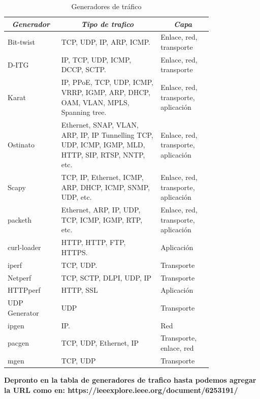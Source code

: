 \documentclass[12pt]{article}
\begin{document}
\begin{table}[htbp]
\footnotesize
\centering
\begin{tabular}{|p{0.2\linewidth}|p{0.4\linewidth}|p{0.2\linewidth}|}\hline
\multicolumn{1}{|c|}{\textit{\textbf{Generador}}} & 
\multicolumn{1}{|c|}{\textit{\textbf{Tipo de trafico}}} &
\multicolumn{1}{|c|}{\textit{\textbf{Capa}}}  \tabularnewline \hline

Bit-twist &
TCP, UDP, IP, ARP, ICMP. & 
Enlace, red, transporte  
\tabularnewline \hline

D-ITG &
IP, TCP, UDP, ICMP, DCCP, SCTP. & 
Enlace, red, transporte  
\tabularnewline \hline

Karat &
IP, PPoE, TCP, UDP, ICMP, VRRP, IGMP, ARP, DHCP, OAM, VLAN, MPLS, Spanning tree.
 & 
Enlace, red, transporte, aplicación  
\tabularnewline \hline

Ostinato &
Ethernet, SNAP, VLAN, ARP, IP, IP Tunnelling TCP, UDP, ICMP, IGMP, MLD, HTTP, SIP, RTSP, NNTP, etc. & 
Enlace, red, transporte, aplicación  
\tabularnewline \hline

Scapy &
TCP, IP, Ethernet, ICMP, ARP, DHCP, ICMP, SNMP, UDP, etc. & 
Enlace, red, transporte, aplicación  
\tabularnewline \hline

packeth &
Ethernet, ARP, IP, UDP, TCP, ICMP, IGMP, RTP, etc. & 
Enlace, red, transporte, aplicación  
\tabularnewline \hline

curl-loader &
HTTP, HTTP, FTP, HTTPS. & 
Aplicación  
\tabularnewline \hline

iperf &
TCP, UDP. & 
Transporte  
\tabularnewline \hline

Netperf &
TCP, SCTP, DLPI, UDP, IP  & 
Transporte  
\tabularnewline \hline

HTTPperf &
HTTP, SSL & 
Aplicación  
\tabularnewline \hline

UDP Generator &
UDP & 
Transporte  
\tabularnewline \hline

ipgen &
IP. & 
Red 
\tabularnewline \hline

pacgen &
TCP, UDP, Ethernet, IP & 
Transporte, enlace, red  
\tabularnewline \hline


mgen &
TCP, UDP & 
Transporte 
\tabularnewline \hline


\end{tabular}
\caption{Generadores de tráfico} \label{tab:sometab}
\end{table} 

\textbf{Depronto en la tabla de generadores de trafico hasta podemos agregar la URL como en: https://ieeexplore.ieee.org/document/6253191/}
\end{document}
